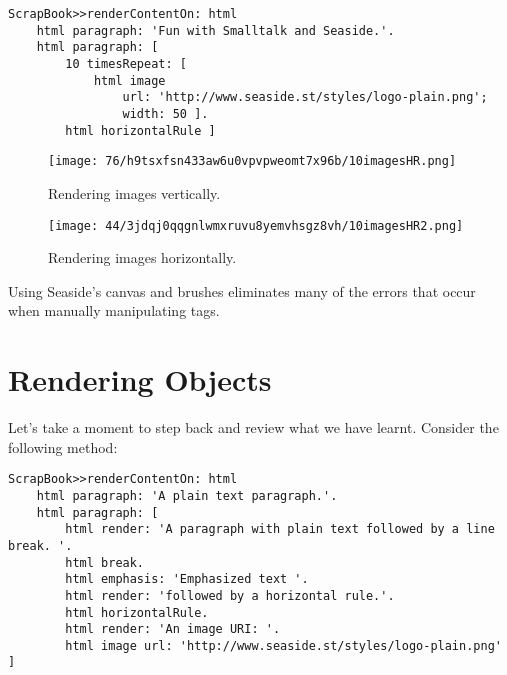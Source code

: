 \documentclass[a4paper,10pt,twoside]{book}
\begin{document}
\begin{lstlisting}
ScrapBook>>renderContentOn: html
    html paragraph: 'Fun with Smalltalk and Seaside.'.
    html paragraph: [
        10 timesRepeat: [
            html image
                url: 'http://www.seaside.st/styles/logo-plain.png';
                width: 50 ].
        html horizontalRule ]
\end{lstlisting}

\begin{figure}[h!tbp]
	\begin{center}
		\texttt{[image: 76/h9tsxfsn433aw6u0vpvpweomt7x96b/10imagesHR.png]}
		\caption{Rendering images vertically.\label{book:fundamentals:renderingcomponents:morefunwithcanvas:10imagesvertical}}
	\end{center}
\end{figure}


\begin{figure}[h!tbp]
	\begin{center}
		\texttt{[image: 44/3jdqj0qqgnlwmxruvu8yemvhsgz8vh/10imagesHR2.png]}
		\caption{Rendering images horizontally.\label{book:fundamentals:renderingcomponents:morefunwithcanvas:10imageshorizontal}}
	\end{center}
\end{figure}


Using Seaside's canvas and brushes eliminates many of the errors that occur when manually manipulating tags.

\section{Rendering Objects}
\label{book:fundamentals:renderingcomponents:renderingobjects}

Let's take a moment to step back and review what we have learnt. Consider the following method:

\begin{lstlisting}
ScrapBook>>renderContentOn: html
    html paragraph: 'A plain text paragraph.'.
    html paragraph: [
        html render: 'A paragraph with plain text followed by a line break. '.
        html break.
        html emphasis: 'Emphasized text '.
        html render: 'followed by a horizontal rule.'.
        html horizontalRule.
        html render: 'An image URI: '.
        html image url: 'http://www.seaside.st/styles/logo-plain.png' ]
\end{lstlisting}
\end{document}
